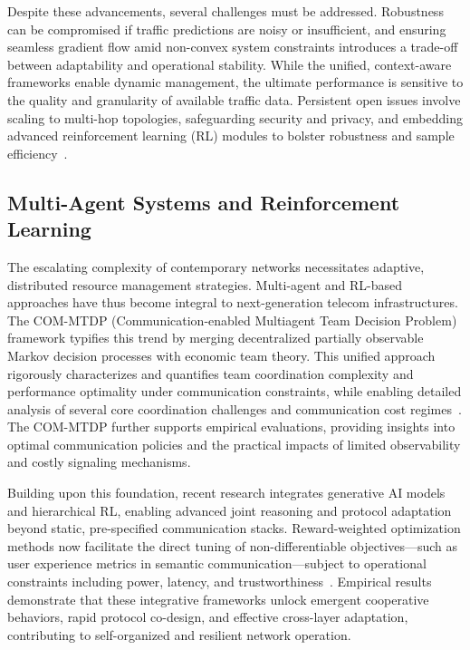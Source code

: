\documentclass[sigconf]{acmart}
\begin{document}
Despite these advancements, several challenges must be addressed. Robustness can be compromised if traffic predictions are noisy or insufficient, and ensuring seamless gradient flow amid non-convex system constraints introduces a trade-off between adaptability and operational stability. While the unified, context-aware frameworks enable dynamic management, the ultimate performance is sensitive to the quality and granularity of available traffic data. Persistent open issues involve scaling to multi-hop topologies, safeguarding security and privacy, and embedding advanced reinforcement learning (RL) modules to bolster robustness and sample efficiency~\cite{ref48}.

\subsection{Multi-Agent Systems and Reinforcement Learning}

The escalating complexity of contemporary networks necessitates adaptive, distributed resource management strategies. Multi-agent and RL-based approaches have thus become integral to next-generation telecom infrastructures. The COM-MTDP (Communication-enabled Multiagent Team Decision Problem) framework typifies this trend by merging decentralized partially observable Markov decision processes with economic team theory. This unified approach rigorously characterizes and quantifies team coordination complexity and performance optimality under communication constraints, while enabling detailed analysis of several core coordination challenges and communication cost regimes~\cite{ref32}. The COM-MTDP further supports empirical evaluations, providing insights into optimal communication policies and the practical impacts of limited observability and costly signaling mechanisms.

Building upon this foundation, recent research integrates generative AI models and hierarchical RL, enabling advanced joint reasoning and protocol adaptation beyond static, pre-specified communication stacks. Reward-weighted optimization methods now facilitate the direct tuning of non-differentiable objectives---such as user experience metrics in semantic communication---subject to operational constraints including power, latency, and trustworthiness~\cite{ref1,ref26,ref36}. Empirical results demonstrate that these integrative frameworks unlock emergent cooperative behaviors, rapid protocol co-design, and effective cross-layer adaptation, contributing to self-organized and resilient network operation.
\end{document}
